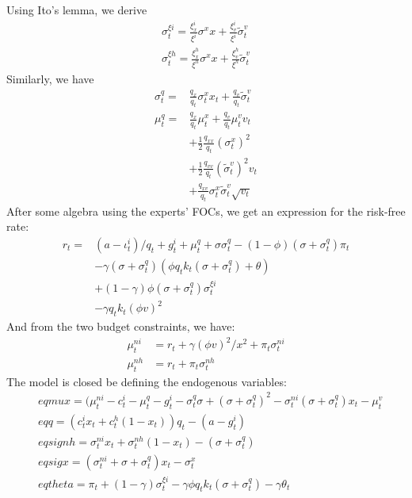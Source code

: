 \documentclass[12pt,english]{article}
\begin{document}
Using Ito's lemma, we derive
\begin{align}
	\sigma_t^{\xi i} = \frac{\xi_{x}^i}{\xi^i}\sigma^x x +  \frac{\xi_{v}^i}{\xi^i}\tilde{\sigma}_t^v\\
	\sigma_t^{\xi h} = \frac{\xi_{x}^h}{\xi^h}\sigma^x x +  \frac{\xi_{v}^h}{\xi^h}\tilde{\sigma}_t^v	
\end{align}
Similarly, we have 
\begin{align}
	\sigma_t^{q} = &\frac{q_{x}}{q_t}\sigma_t^x x_t +  \frac{q_{v}}{q_t}\tilde{\sigma}_t^v\\
	\mu_t^q = &\frac{q_x}{q_t}\mu_t^x + \frac{q_v}{q_t}\mu_t^vv_t \\
			& + \frac{1}{2}\frac{q_{xx}}{q_t}(\sigma_t^x)^2\\
			& + \frac{1}{2}\frac{q_{vv}}{q_t}(\tilde{\sigma}_t^v)^2v_t \\
			& + \frac{q_{xv}}{q_t}\sigma_t^x\tilde{\sigma}_t^v\sqrt{v_t}
\end{align}
After some algebra using the experts' FOCs, we get an expression for the risk-free rate:
\begin{align}
	r_t = & (a - \iota_t^i)/q_t + g_t^i + \mu_t^q + \sigma\sigma_t^q - (1 - \phi)(\sigma + \sigma_t^q)\pi_t \\
	        & -\gamma(\sigma + \sigma_t^q)(\phi q_tk_t(\sigma + \sigma_t^q) + \theta) \\
	        & + ( 1 - \gamma)\phi(\sigma + \sigma_t^q)\sigma_t^{\xi i}\\
	        & - \gamma q_tk_t(\phi v)^2
\end{align} 
And from the two budget constraints, we have:
\begin{align}
	\mu_t^{ni} &= r_t + \gamma(\phi v)^2/x^2 + \pi_t\sigma_t^{ni}\\
	\mu_t^{nh} &= r_t  + \pi_t\sigma_t^{nh}
\end{align}
The model is closed be defining the endogenous variables:
\begin{align}
	&eqmux = (\mu_t^{ni} - c_t^i - \mu_t^q - g_t^i - \sigma_t^q\sigma + (\sigma + \sigma_t^q)^2 - \sigma_t^{ni}(\sigma + \sigma_t^q)x_t - \mu_t^v\\
	&eqq      = (c_t^ix_t + c_t^h(1 - x_t))q_t - (a - g_t^i) \\
	&eqsignh = \sigma_t^{ni}x_t + \sigma_t^{nh}(1 - x_t) - (\sigma + \sigma_t^q)\\
	&eqsigx   = (\sigma_t^{ni} + \sigma + \sigma_t^q)x_t - \sigma_t^x\\
	&eqtheta = \pi_t + ( 1 - \gamma)\sigma_t^{\xi i} - \gamma\phi q_tk_t(\sigma + \sigma_t^q) - \gamma\theta_t
\end{align}

\end{document}
